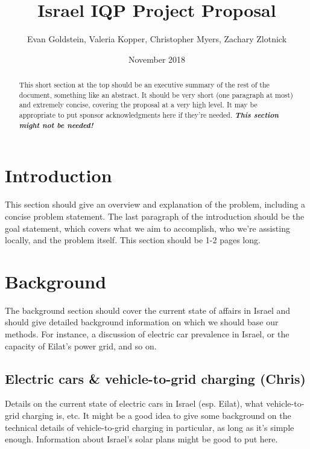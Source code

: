 \documentclass{article}                         %
\title{Israel IQP Project Proposal}
\author{Evan Goldstein, Valeria Kopper, Christopher Myers, Zachary Zlotnick}
\date{November 2018}
\begin{document}
\maketitle

\renewcommand\abstractname{Summary} %
\begin{abstract}
This short section at the top should be an executive summary of the rest of the document, something like an abstract. It should be very short (one paragraph at most) and extremely concise, covering the proposal at a very high level. It may be appropriate to put sponsor acknowledgments here if they're needed. \textbf{\textit{This section might not be needed!}}
\end{abstract}

\tableofcontents
\newpage
{}

\doublespacing

\section{Introduction}
This section should give an overview and explanation of the problem, including a concise problem statement. The last paragraph of the introduction should be the goal statement, which covers what we aim to accomplish, who we're assisting locally, and the problem itself. This section should be 1-2 pages long.

\newpage
\section{Background}
The background section should cover the current state of affairs in Israel and should give detailed background information on which we should base our methods. For instance, a discussion of electric car prevalence in Israel, or the capacity of Eilat's power grid, and so on.

\subsection{Electric cars \& vehicle-to-grid charging (Chris)}
Details on the current state of electric cars in Israel (esp. Eilat), what vehicle-to-grid charging is, etc. It might be a good idea to give some background on the technical details of vehicle-to-grid charging in particular, as long as it's simple enough. Information about Israel's solar plans might be good to put here.
\end{document}
